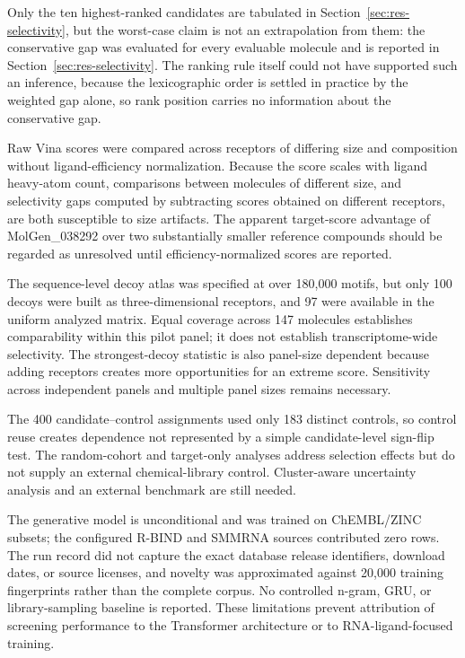 \documentclass[journal]{IEEEtran}
\begin{document}
Only the ten highest-ranked candidates are tabulated in
Section~\ref{sec:res-selectivity}, but the worst-case claim is not an
extrapolation from them: the conservative gap was evaluated for every
evaluable molecule and is reported in
Section~\ref{sec:res-selectivity}. The ranking rule itself could not
have supported such an inference, because the lexicographic order is
settled in practice by the weighted gap alone, so rank position carries
no information about the conservative gap.

Raw Vina scores were compared across receptors of differing size and
composition without ligand-efficiency normalization. Because the score
scales with ligand heavy-atom count, comparisons between molecules of
different size, and selectivity gaps computed by subtracting scores
obtained on different receptors, are both susceptible to size artifacts.
The apparent target-score advantage of MolGen\_038292 over two
substantially smaller reference compounds should be regarded as
unresolved until efficiency-normalized scores are reported.

The sequence-level decoy atlas was specified at over 180{,}000 motifs,
but only 100 decoys were built as three-dimensional receptors, and 97
were available in the uniform analyzed matrix. Equal coverage across
147 molecules establishes comparability within this pilot panel; it does
not establish transcriptome-wide selectivity. The strongest-decoy
statistic is also panel-size dependent because adding receptors creates
more opportunities for an extreme score. Sensitivity across independent
panels and multiple panel sizes remains necessary.

The 400 candidate--control assignments used only 183 distinct controls,
so control reuse creates dependence not represented by a simple
candidate-level sign-flip test. The random-cohort and target-only
analyses address selection effects but do not supply an external
chemical-library control. Cluster-aware uncertainty analysis and an
external benchmark are still needed.

The generative model is unconditional and was trained on ChEMBL/ZINC
subsets; the configured R-BIND and SMMRNA sources contributed zero rows.
The run record did not capture the exact database release identifiers,
download dates, or source licenses, and novelty was approximated against
20{,}000 training fingerprints rather than the complete corpus. No
controlled n-gram, GRU, or library-sampling baseline is reported. These
limitations prevent attribution of screening performance to the
Transformer architecture or to RNA-ligand-focused training.
\end{document}
